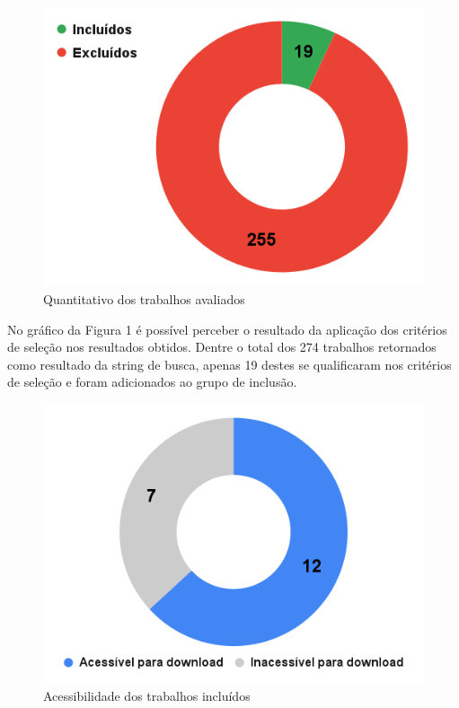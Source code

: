 \documentclass[conference]{IEEEtran}
\begin{document}
\begin{figure}[h]
    \centering
    \includegraphics[scale=0.4]{images/quantitativo-trabalhos-avaliados.png}
    \caption{Quantitativo dos trabalhos avaliados}
    \label{fig:quantitativo-trabalhos-avaliados}
\end{figure}

No gráfico da Figura 1 é possível perceber o resultado da aplicação dos critérios de seleção nos resultados obtidos. Dentre o total dos 274 trabalhos retornados como resultado da string de busca, apenas 19 destes se qualificaram nos critérios de seleção e foram adicionados ao grupo de inclusão.

\begin{figure}[h]
    \centering
    \includegraphics[scale=0.4]{images/acessibilidade-trabalhos-incluidos.png}
    \caption{Acessibilidade dos trabalhos incluídos}
    \label{fig:acessibilidade-trabalhos-incluidos}
\end{figure}
\end{document}
